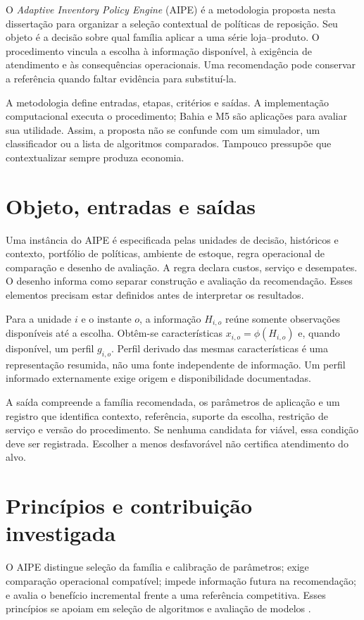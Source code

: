 
O \textit{Adaptive Inventory Policy Engine} (AIPE) é a metodologia proposta nesta dissertação para organizar a seleção contextual de políticas de reposição. Seu objeto é a decisão sobre qual família aplicar a uma série loja--produto. O procedimento vincula a escolha à informação disponível, à exigência de atendimento e às consequências operacionais. Uma recomendação pode conservar a referência quando faltar evidência para substituí-la.

A metodologia define entradas, etapas, critérios e saídas. A implementação computacional executa o procedimento; Bahia e M5 são aplicações para avaliar sua utilidade. Assim, a proposta não se confunde com um simulador, um classificador ou a lista de algoritmos comparados. Tampouco pressupõe que contextualizar sempre produza economia.

\section{Objeto, entradas e saídas}
\label{sec:visao_geral_aipe}\label{sec:formulacao}
Uma instância do AIPE é especificada pelas unidades de decisão, históricos e contexto, portfólio de políticas, ambiente de estoque, regra operacional de comparação e desenho de avaliação. A regra declara custos, serviço e desempates. O desenho informa como separar construção e avaliação da recomendação. Esses elementos precisam estar definidos antes de interpretar os resultados.

Para a unidade $i$ e o instante $o$, a informação $H_{i,o}$ reúne somente observações disponíveis até a escolha. Obtêm-se características $x_{i,o}=\phi(H_{i,o})$ e, quando disponível, um perfil $g_{i,o}$. Perfil derivado das mesmas características é uma representação resumida, não uma fonte independente de informação. Um perfil informado externamente exige origem e disponibilidade documentadas.

A saída compreende a família recomendada, os parâmetros de aplicação e um registro que identifica contexto, referência, suporte da escolha, restrição de serviço e versão do procedimento. Se nenhuma candidata for viável, essa condição deve ser registrada. Escolher a menos desfavorável não certifica atendimento do alvo.

\section{Princípios e contribuição investigada}
O AIPE distingue seleção da família e calibração de parâmetros; exige comparação operacional compatível; impede informação futura na recomendação; e avalia o benefício incremental frente a uma referência competitiva. Esses princípios se apoiam em seleção de algoritmos e avaliação de modelos \citep{Rice1976AlgorithmSelection,Kerschke2019AutomatedAlgorithmSelection,CawleyTalbot2010}.

